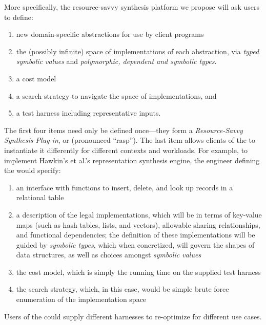 

\noindent
More specifically, the resource-savvy synthesis platform we propose will ask users to define:

\begin{enumerate}
\item new domain-specific abstractions for use by client programs
\item the (possibly infinite) space of implementations of each abstraction,
via \emph{typed symbolic values} and \emph{polymorphic, dependent and symbolic types}.
\item a cost model
\item a search strategy to navigate the space of implementations, and
\item a test harness including representative inputs.
\end{enumerate}
%
The first four items need only be defined once---they form a
\emph{Resource-Savvy Synthesis Plug-in}, or \rasp{}  (pronounced ``rasp'').
The last item allows clients of the \rasp to instantiate it differently for
different contexts and workloads.
For example, to implement Hawkin's et al.'s representation synthesis engine, 
the engineer defining the \rasp{} would specify:

\begin{enumerate}
\item an interface with functions to insert, delete, and look up records in a relational table
\item a description of the legal implementations, which will be in terms of key-value maps
(such as hash tables, lists, and vectors), allowable sharing
relationships, and functional dependencies; the definition of these
implementations will be guided by \emph{symbolic types}, which when 
concretized, will govern the shapes of data structures, as well as
choices amongst \emph{symbolic values}
\item the cost model, which is simply the running time on the supplied test harness
\item the search strategy, which, in this case, would be simple 
brute force enumeration of the implementation space
\end{enumerate}
%
Users of the \rasp{} could supply different harnesses to re-optimize for
different use cases.

